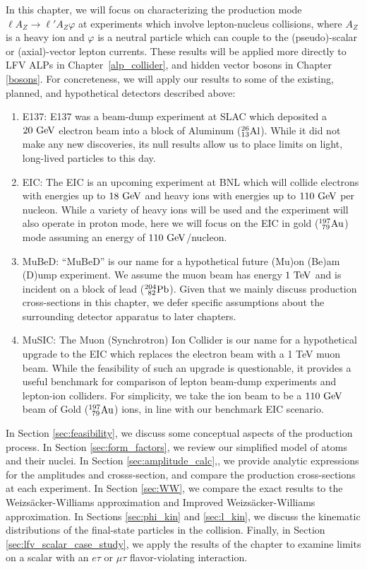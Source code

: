 In this chapter, we will focus on characterizing the production mode $\ell A_Z \rightarrow \ell' A_Z \varphi$ at experiments which involve lepton-nucleus collisions, where $A_Z$ is a heavy ion and $\varphi$ is a neutral particle which can couple to the (pseudo)-scalar or (axial)-vector lepton currents. These results will be applied more directly to LFV ALPs in Chapter~\ref{alp_collider}, and hidden vector bosons in Chapter \ref{bosons}. For concreteness, we will apply our results to some of the existing, planned, and hypothetical detectors described above: 
\begin{enumerate}
    \item E137: E137 was a beam-dump experiment at SLAC which deposited a $20~{\rm GeV}$ electron beam into a block of Aluminum ($_{13}^{26}{\rm Al}$). While it did not make any new discoveries, its null results allow us to place limits on light, long-lived particles to this day. 
    \item EIC: The EIC is an upcoming experiment at BNL which will collide electrons with energies up to $18~{\rm GeV}$ and heavy ions with energies up to $110~{\rm GeV}$ per nucleon. While a variety of heavy ions will be used and the experiment will also operate in proton mode, here we will focus on the EIC in gold ($_{\ 79}^{197}{\rm Au}$) mode assuming an energy of $110~{\rm GeV}$/nucleon.
    \item MuBeD: ``MuBeD'' is our name for a hypothetical future (Mu)on (Be)am (D)ump experiment. We assume the muon beam has energy $1~{\rm TeV}$ and is incident on a block of lead ($_{\ 82}^{204}{\rm Pb}$). Given that we mainly discuss production cross-sections in this chapter, we defer specific assumptions about the surrounding detector apparatus to later chapters.
    \item MuSIC: The Muon (Synchrotron) Ion Collider is our name for a hypothetical upgrade to the EIC which replaces the electron beam with a 1 TeV muon beam. While the feasibility of such an upgrade is questionable, it provides a useful benchmark for comparison of lepton beam-dump experiments and lepton-ion colliders. For simplicity, we take the ion beam to be a $110~{\rm GeV}$ beam of Gold ($_{\ 79}^{197}{\rm Au}$) ions, in line with our benchmark EIC scenario.
\end{enumerate}
In Section \ref{sec:feasibility}, we discuss some conceptual aspects of the production process. In Section \ref{sec:form_factors}, we review our simplified model of atoms and their nuclei. In Section  \ref{sec:amplitude_calc},, we provide analytic expressions for the amplitudes and crosss-section, and compare the production cross-sections at each experiment. In Section \ref{sec:WW}, we compare the exact results to the Weizs\"acker-Williams approximation and Improved Weizs\"acker-Williams approximation. In Sections \ref{sec:phi_kin} and \ref{sec:l_kin}, we discuss the kinematic distributions of the final-state particles in the collision. Finally, in Section \ref{sec:lfv_scalar_case_study}, we apply the results of the chapter to examine limits on a scalar with an $e\tau$ or $\mu\tau$ flavor-violating interaction.


